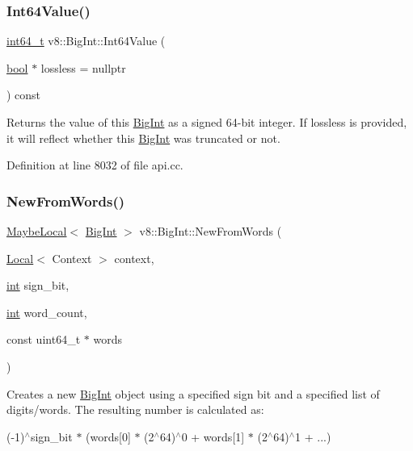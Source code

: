 \subsubsection{\texorpdfstring{Int64\+Value()}{Int64Value()}}
{\footnotesize\ttfamily \mbox{\hyperlink{classint64__t}{int64\+\_\+t}} v8\+::\+Big\+Int\+::\+Int64\+Value (\begin{DoxyParamCaption}\item[{\mbox{\hyperlink{classbool}{bool}} $\ast$}]{lossless = {\ttfamily nullptr} }\end{DoxyParamCaption}) const}

Returns the value of this \mbox{\hyperlink{classv8_1_1BigInt}{Big\+Int}} as a signed 64-\/bit integer. If {\ttfamily lossless} is provided, it will reflect whether this \mbox{\hyperlink{classv8_1_1BigInt}{Big\+Int}} was truncated or not. 

Definition at line 8032 of file api.\+cc.

\mbox{\label{classv8_1_1BigInt_a89e705d9fa4f512dbce05968de727522}} 
\subsubsection{\texorpdfstring{New\+From\+Words()}{NewFromWords()}}
{\footnotesize\ttfamily \mbox{\hyperlink{classv8_1_1MaybeLocal}{Maybe\+Local}}$<$ \mbox{\hyperlink{classv8_1_1BigInt}{Big\+Int}} $>$ v8\+::\+Big\+Int\+::\+New\+From\+Words (\begin{DoxyParamCaption}\item[{\mbox{\hyperlink{classv8_1_1Local}{Local}}$<$ Context $>$}]{context,  }\item[{\mbox{\hyperlink{classint}{int}}}]{sign\+\_\+bit,  }\item[{\mbox{\hyperlink{classint}{int}}}]{word\+\_\+count,  }\item[{const uint64\+\_\+t $\ast$}]{words }\end{DoxyParamCaption})\hspace{0.3cm}{\ttfamily [static]}}

Creates a new \mbox{\hyperlink{classv8_1_1BigInt}{Big\+Int}} object using a specified sign bit and a specified list of digits/words. The resulting number is calculated as\+:

(-\/1)$^\wedge$sign\+\_\+bit $\ast$ (words\mbox{[}0\mbox{]} $\ast$ (2$^\wedge$64)$^\wedge$0 + words\mbox{[}1\mbox{]} $\ast$ (2$^\wedge$64)$^\wedge$1 + ...) 

